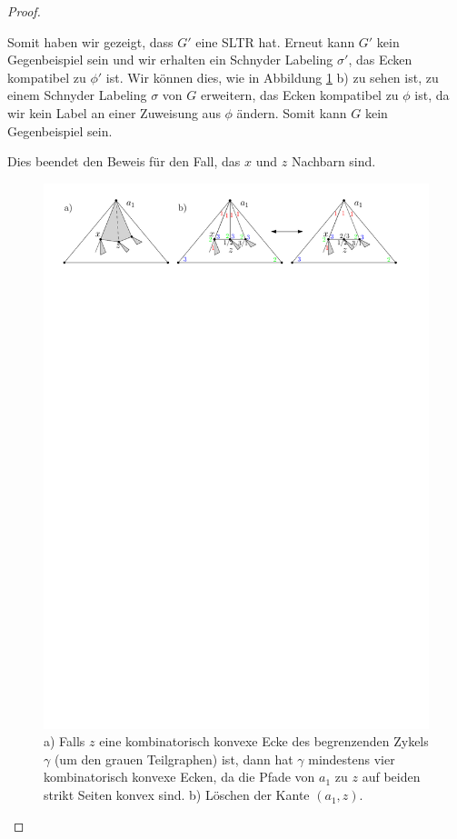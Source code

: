 \begin{proof}
\begin{description}[leftmargin =0pt, font = \rmfamily ]
Somit haben wir gezeigt, dass $G'$ eine SLTR hat. Erneut kann $G'$ kein Gegenbeispiel sein und wir erhalten ein Schnyder Labeling $\sigma'$, das Ecken kompatibel zu $\phi'$ ist. Wir können dies, wie in Abbildung \ref{pic_lem5_9} b) zu sehen ist, zu einem Schnyder Labeling $\sigma$ von $G$ erweitern, das Ecken kompatibel zu $\phi$ ist, da wir kein Label an einer Zuweisung aus $\phi$ ändern. Somit kann $G$ kein Gegenbeispiel sein.

Dies beendet den Beweis für den Fall, das $x$ und $z$ Nachbarn sind.

\begin{figure}[h]
\centering
\includegraphics[width=1\textwidth]{lem5_9.pdf}
\caption{a) Falls $z$ eine kombinatorisch konvexe Ecke des begrenzenden Zykels $\gamma$ (um den grauen Teilgraphen) ist, dann hat $\gamma$ mindestens vier kombinatorisch konvexe Ecken, da die Pfade von $a_1$ zu $z$ auf beiden strikt Seiten konvex sind. b) Löschen der Kante $(a_1,z)$. }
\label{pic_lem5_9}
\end{figure}


\end{description}
\end{proof}
